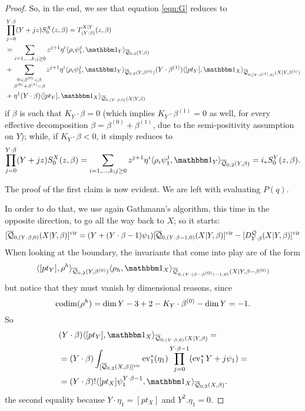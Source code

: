 \begin{proof}
So, in the end, we see that equation \ref{eqn:G} reduces to
\begin{align*}
 &\prod_{j=0}^{Y\cdot\beta}(Y+jz) S_0^X(z,\beta) = T_{(Y\cdot\beta)}^{X|Y}(z,\beta) \\
 &= \sum_{i=1,\ldots,k;j\geq 0}z^{j+1}\eta^i\langle \rho_i\psi_1^j,\mathbbm 1_{Y}\rangle_{\Q{0}{2}{Y}{\beta}} \\
 &+\sum_{\substack{0<\beta^{(0)}<\beta \\ \beta^{(0)}+\beta^{(1)}=\beta}}z^{j+1}\eta^i\langle \rho_i\psi_1^j,\mathbbm 1_{Y}\rangle_{\Q{0}{2}{Y}{\beta^{(0)}}}(Y\cdot\beta^{(1)})\langle [pt_Y],\mathbbm 1_{X}\rangle_{\Q{0}{(Y\cdot\beta^{(1)},0)}{X|Y}{\beta^{(1)}}}\\
 &+\eta^1(Y\cdot\beta)\langle [pt_Y],\mathbbm 1_{X}\rangle_{\Q{0}{(Y\cdot\beta,0)}{X|Y}{\beta}}
\end{align*}
if $\beta$ is such that $K_Y\cdot\beta=0$ (which implies $K_Y\cdot\beta^{(1)}=0$ as well, for every effective decomposition $\beta=\beta^{(0)}+\beta^{(1)}$, due to the semi-positivity assumption on $Y$); while, if $K_Y\cdot\beta<0$, it simply reduces to
\[
 \prod_{j=0}^{Y\cdot\beta}(Y+jz) S_0^X(z,\beta)= \sum_{i=1,\ldots,k;j\geq 0}z^{j+1}\eta^i\langle \rho_i\psi_1^j,\mathbbm 1_{Y}\rangle_{\Q{0}{2}{Y}{\beta}} = i_*S_0^Y(z,\beta).
\]


The proof of the first claim is now evident. We are left with evaluating $P(q)$.

In order to do that, we use again Gathmann's algorithm, this time in the opposite direction, to go all the way back to $X$; so it starts:
\[
 [\overline{\mathcal Q}_{0,(Y \cdot \beta,0)}(X|Y,\beta)]^\text{vir}=(Y+(Y\cdot\beta-1)\psi_1)[\overline{\mathcal Q}_{0,(Y\cdot\beta-1,0)}(X|Y,\beta)]^\text{vir}-[D_{Y\cdot\beta}^{\mathcal Q}(X|Y,\beta)]^\text{vir}
\]
When looking at the boundary, the invariants that come into play are of the form
\[
 \langle [pt_Y],\rho^h\rangle_{\Q{0}{2}{Y}{\beta^{(0)}}}\langle \rho_h,\mathbbm 1_{X}\rangle_{\Q{0}{(Y\cdot(\beta-\beta^{(0)})-1,0)}{X|Y}{\beta-\beta^{(0)}}}
\]
but notice that they must vanish by dimensional reasons, since
\[
 \operatorname{codim}(\rho^h)=\dim Y-3+2-K_Y\cdot\beta^{(0)}-\dim Y=-1.
\]
So
\begin{align*}
 & (Y\cdot\beta)\langle [pt_Y],\mathbbm 1_{X}\rangle_{\Q{0}{(Y\cdot\beta,0)}{X|Y}{\beta}} = \\
 & = (Y\cdot\beta)\int_{[\Q{0}{2}{X}{\beta}]^{\text{vir}}}\ev_1^*(\eta_1)\prod_{j=0}^{Y\cdot\beta-1}(\ev_1^*Y+j\psi_1) = \\
 & = (Y\cdot\beta)!\langle[pt_X]\psi_1^{Y\cdot\beta-1},\mathbbm 1_X\rangle_{\Q{0}{2}{X}{\beta}}.
\end{align*}
the second equality because $Y\cdot\eta_1=[pt_X]$ and $Y^2.\eta_1=0$.
\end{proof}

